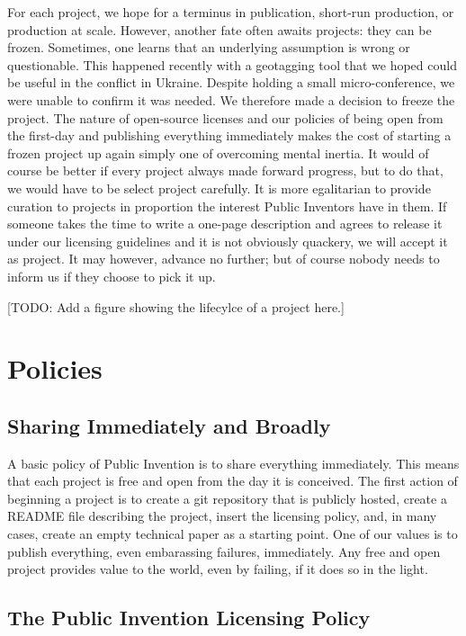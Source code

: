 \documentclass[
	fontsize=10pt, %
	twoside=false, %
	secnumdepth=1, %
]{kaobook}
\begin{document}
For each project, we hope for a terminus in publication, short-run
production, or production at scale. However, another fate often
awaits projects: they can be frozen. Sometimes, one learns
that an underlying assumption is wrong or questionable.
This happened recently with a geotagging tool that we hoped could
be useful in the conflict in Ukraine. Despite holding a small
micro-conference, we were unable to confirm it was needed.
We therefore made a decision to freeze the project.
The nature of open-source licenses and our policies of being
open from the first-day and publishing everything immediately
makes the cost of starting a frozen project up again simply one of
overcoming mental inertia.
It would of course be better if every project always made
forward progress, but to do that, we would have to be
select project carefully.
It is more egalitarian to provide curation to projects in
proportion the interest Public Inventors have in them.
If someone takes the time to write a one-page description and agrees
to release it under our licensing guidelines and it is not obviously
quackery, we will accept it as project.
It may however, advance no further; but of course nobody needs
to inform us if they choose to pick it up.

[TODO: Add a figure showing the lifecylce of a project here.]

\chapter{Policies}


\section{Sharing Immediately and Broadly}

A basic policy of Public Invention is to share everything immediately.
This means that each project is free and open from the day it is conceived.
The first action of beginning a project is to create a git repository that
is publicly hosted, create a README file describing the project,
insert the licensing policy, and, in many cases, create an empty
technical paper as a starting point.
One of our values is to publish everything, even embarassing failures,
immediately.
Any free and open project provides value to the world, even by failing,
if it does so in the light.

\section{The Public Invention Licensing Policy}
\end{document}
